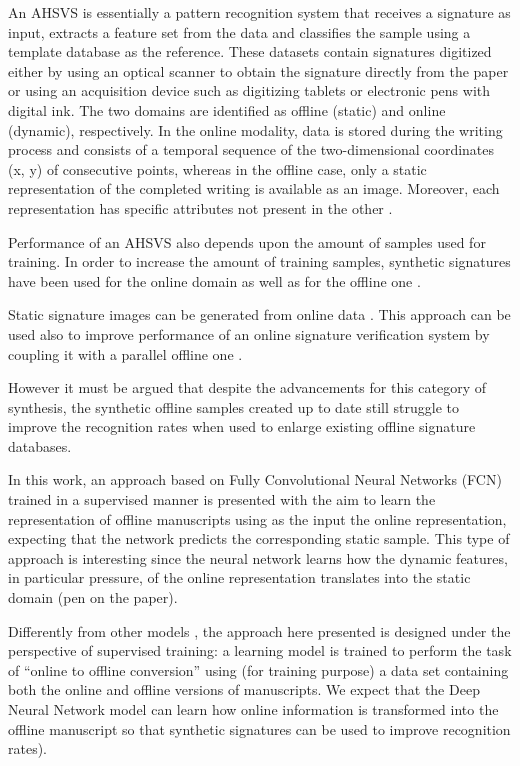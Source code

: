 An AHSVS is essentially a pattern recognition system that receives a signature as input, extracts a feature set from the data and classifies the sample using a template database as the reference. These datasets contain signatures digitized either by using an optical scanner to obtain the signature directly from the paper or using an acquisition device such as digitizing tablets or electronic pens with digital ink. The two domains are identified as offline (static) and online (dynamic), respectively.  In the online modality, data is stored during the writing process and consists of a temporal sequence of the two-dimensional coordinates (x, y) of consecutive points, whereas in the offline case, only a static representation of the completed writing is available as an image. Moreover, each representation has specific attributes not present in the other \cite{viard1999ireste}. 

Performance of an AHSVS also depends upon the amount of samples used for training. In order to increase the amount of training samples, synthetic signatures have been used for the online domain  \cite{galbally2009synthetic, galbally2012synthetic} as well as for the offline one \cite{ferrer2013synthetic, ferrer2013realistic}.

Static signature images can be generated from online data  \cite{diaz2014generation, guest2013assessment, ferrer2013realistic, galbally2015line}. This approach can be used also to improve performance of an online signature verification system by coupling it with a parallel offline one \cite{chapter}.

However it must be argued that despite the advancements for this category of synthesis, the synthetic offline samples created up to date still struggle to improve the recognition rates when used to enlarge existing offline signature databases.

In this work, an approach based on Fully Convolutional Neural Networks (FCN) trained in a supervised manner is presented with the aim to learn the representation of offline manuscripts using as the input the online representation, expecting that the network predicts the corresponding static sample. This type of approach is interesting since the neural network learns how the dynamic features, in particular pressure, of the online representation translates into the static domain (pen on the paper).

Differently from other models \cite{ferrer2013synthetic, ferrer2013realistic, diaz2014generation}, the approach here presented is designed under the perspective of supervised training: a learning model is trained to perform the task of “online to offline conversion” using (for training purpose) a data set containing both the online and offline versions of manuscripts. We expect that the Deep Neural Network model can learn how online information is transformed into the offline manuscript so that synthetic signatures can be used to improve recognition rates). 

